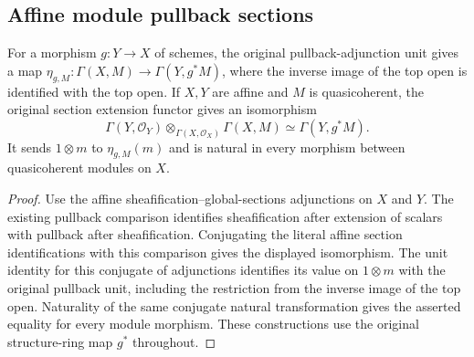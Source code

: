 \subsection{Affine module pullback sections}

\begin{theorem}
\label{scheme:existing-affine-module-pullback-sections}
\leanok
For a morphism $g:Y\to X$ of schemes, the original pullback-adjunction
unit gives a map $\eta_{g,M}:\Gamma(X,M)\to\Gamma(Y,g^*M)$,
where the inverse image of the top open is identified with the top open.
If $X,Y$ are affine and $M$ is quasicoherent, the original section
extension functor gives an isomorphism
\[
 \Gamma(Y,\mathcal O_Y)\otimes_{\Gamma(X,\mathcal O_X)}\Gamma(X,M)
       \simeq\Gamma(Y,g^*M).
\]
It sends $1\otimes m$ to $\eta_{g,M}(m)$ and is natural in every
morphism between quasicoherent modules on $X$.
\end{theorem}
\begin{proof}
Use the affine sheafification--global-sections adjunctions on $X$
and $Y$. The existing pullback comparison identifies sheafification
after extension of scalars with pullback after sheafification.
Conjugating the literal affine section identifications with this
comparison gives the displayed isomorphism. The unit identity for
this conjugate of adjunctions identifies its value on $1\otimes m$
with the original pullback unit, including the restriction from the
inverse image of the top open. Naturality of the same conjugate
natural transformation gives the asserted equality for every module
morphism. These constructions use the original structure-ring map
$g^*$ throughout.
\end{proof}
